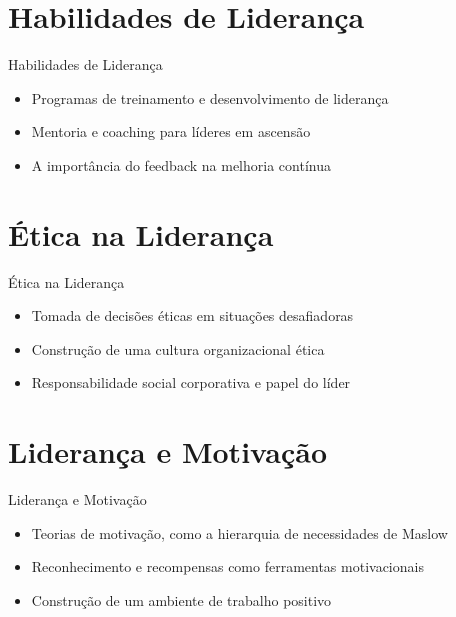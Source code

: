 \documentclass[aspectratio=169,xcolor=dvipsnames]{beamer}
\begin{document}
\section{Habilidades de Liderança}

\begin{frame}{Habilidades de Liderança}
	\begin{itemize}
		\item Programas de treinamento e desenvolvimento de liderança
		\item Mentoria e coaching para líderes em ascensão
		\item A importância do feedback na melhoria contínua

	\end{itemize}
\end{frame}

\section{Ética na Liderança}

\begin{frame}{Ética na Liderança}
	\begin{itemize}
		\item Tomada de decisões éticas em situações desafiadoras
		\item Construção de uma cultura organizacional ética
		\item Responsabilidade social corporativa e papel do líder

	\end{itemize}
\end{frame}

\section{Liderança e Motivação}

\begin{frame}{Liderança e Motivação}
	\begin{itemize}
		\item Teorias de motivação, como a hierarquia de necessidades de Maslow
		\item Reconhecimento e recompensas como ferramentas motivacionais
		\item Construção de um ambiente de trabalho positivo

	\end{itemize}
\end{frame}
\end{document}
